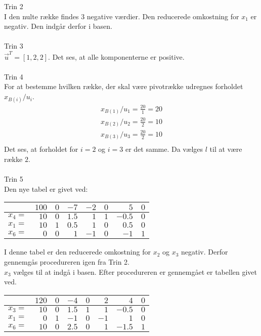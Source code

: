 \begin{eks}
Trin 2\\
I den nulte række findes $3$ negative værdier. Den reducerede omkostning for $x_1$ er negativ. Den indgår derfor i basen. \\
\\
Trin 3\\
$\vec{u}^T=[1,2,2]$. Det ses, at alle komponenterne er positive. \\
\\
Trin 4\\
For at bestemme hvilken række, der skal være pivotrække udregnes forholdet $x_{B(i)}/u_i$. 
\begin{align*}
x_{B(1)}/u_1=\frac{20}{1}=20\\
x_{B(2)}/u_2=\frac{20}{2}=10\\
x_{B(3)}/u_3=\frac{20}{2}=10\\
\end{align*}
Det ses, at forholdet for $i=2$ og $i=3$ er det samme. Da vælges $l$ til at være række $2$. \\
\\
Trin 5\\
Den nye tabel er givet ved:
\begin{center}
\begin{tabular}{r| r|r r r r r r|}
  \hline	
  &$100$&$0$ &$-7$&$-2$&$0$&$5$&$0$\\ \hline	
  $x_4=$&$10$&$0$&$1.5$&$1$&$1$&$-0.5$&$0$\\	
  $x_1=$&$10$&$1$&$0.5$&$1$&$0$&$0.5$&$0$\\
  $x_6=$&$0$&$0$&$1$&$-1$&$0$&$-1$&$1$\\
   \hline
\end{tabular}
\end{center}
I denne tabel er den reducerede omkostning for $x_2$ og $x_3$ negativ. Derfor gennemgås procedureren igen fra Trin 2.\\
$x_3$ vælges til at indgå i basen. Efter procedureren er gennemgået er tabellen givet ved. 
\begin{center}
\begin{tabular}{r| r|r r r r r r|}
  \hline	
  &$120$&$0$ &$-4$&$0$&$2$&$4$&$0$\\ \hline	
  $x_3=$&$10$&$0$&$1.5$&$1$&$1$&$-0.5$&$0$\\	
  $x_1=$&$0$&$1$&$-1$&$0$&$-1$&$1$&$0$\\
  $x_6=$&$10$&$0$&$2.5$&$0$&$1$&$-1.5$&$1$\\
   \hline
\end{tabular}
\end{center}

\end{eks}
